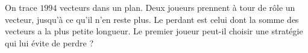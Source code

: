 On trace $1994$ vecteurs dans un plan. Deux joueurs prennent à tour de rôle un vecteur, jusqu'à ce qu'il n'en reste plus. Le perdant est celui dont la somme des vecteurs a la plus petite longueur. Le premier joueur peut-il choisir une stratégie qui lui évite de perdre ?
